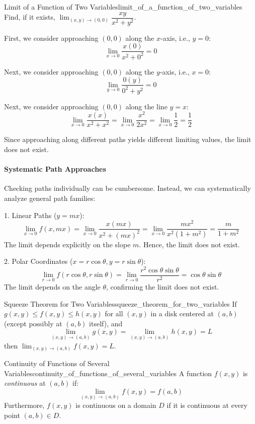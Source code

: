 \begin{problem}{Limit of a Function of Two Variables}{limit_of_a_function_of_two_variables}
Find, if it exists, $\displaystyle\lim_{(x, y) \to (0, 0)}{\dfrac{xy}{x^2 + y^2}}$.
\end{problem}

\begin{sol}
First, we consider approaching $(0, 0)$ along the $x$-axis, i.e., $y = 0$:
\[
\lim_{x \to 0}{\frac{x(0)}{x^2 + 0^2}} = 0
\]

Next, we consider approaching $(0, 0)$ along the $y$-axis, i.e., $x = 0$:
\[
\lim_{y \to 0}{\frac{0(y)}{0^2 + y^2}} = 0
\]

Next, we consider approaching $(0, 0)$ along the line $y = x$:
\[
\lim_{x \to 0}{\frac{x(x)}{x^2 + x^2}} = \lim_{x \to 0}{\frac{x^2}{2x^2}} = \lim_{x \to 0}{\frac{1}{2}} = \frac{1}{2}
\]

Since approaching along different paths yields different limiting values, the limit does not exist.

\paragraph{Systematic Path Approaches} Checking paths individually can be cumbersome. Instead, we can systematically analyze general path families:

1. Linear Paths ($y = mx$):
   \[
   \lim_{x \to 0}{f(x, mx)} = \lim_{x \to 0}{\frac{x(mx)}{x^2 + (mx)^2}} = \lim_{x \to 0}{\frac{mx^2}{x^2(1 + m^2)}} = \frac{m}{1 + m^2}
   \]
   The limit depends explicitly on the slope $m$. Hence, the limit does not exist.

2. Polar Coordinates ($x = r\cos\theta, y = r\sin\theta$):
   \[
   \lim_{r \to 0}{f(r \cos \theta, r \sin \theta)} = \lim_{r \to 0}{\dfrac{r^2 \cos\theta\sin\theta}{r^2}} = \cos\theta\sin\theta
   \]
   The limit depends on the angle $\theta$, confirming the limit does not exist.
\end{sol}

\begin{definition}{Squeeze Theorem for Two Variables}{squeeze_theorem_for_two_variables}
If $g(x, y) \leq f(x, y) \leq h(x, y)$ for all $(x, y)$ in a disk centered at $(a, b)$ (except possibly at $(a, b)$ itself), and 
\[
\lim_{(x, y) \to (a, b)} g(x, y) = \lim_{(x, y) \to (a, b)} h(x, y) = L
\]
then $\lim_{(x, y) \to (a, b)} f(x, y) = L$.
\end{definition}

\begin{definition}{Continuity of Functions of Several Variables}{continuity_of_functions_of_several_variables}
A function $f(x, y)$ is \textit{continuous} at $(a, b)$ if:
\[
\lim_{(x, y) \to (a, b)} f(x, y) = f(a, b)
\]
Furthermore, $f(x, y)$ is continuous on a domain $D$ if it is continuous at every point $(a, b) \in D$.
\end{definition}

